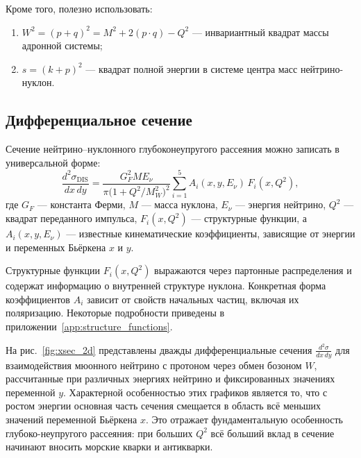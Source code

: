 Кроме того, полезно использовать:
\begin{enumerate}
  \item \( W^2 = (p + q)^2 = M^2 + 2(p \cdot q) - Q^2 \) — инвариантный квадрат массы адронной системы;
  \item \( s = (k + p)^2 \) — квадрат полной энергии в системе центра масс нейтрино-нуклон.
\end{enumerate}

\subsection{Дифференциальное сечение}

Сечение нейтрино–нуклонного глубоконеупругого рассеяния можно записать в универсальной форме:
\begin{equation}
  \frac{d^2 \sigma_{\text{DIS}}}{dx\,dy} =
  \frac{G_F^2 M E_\nu}{\pi \bigl(1 + Q^2/M_W^2\bigr)^2}
  \sum_{i=1}^{5} A_i(x, y, E_\nu)\, F_i(x, Q^2),
  \label{eq:xsec_general}
\end{equation}
где \( G_F \) — константа Ферми, \( M \) — масса нуклона, \( E_\nu \) — энергия нейтрино, \( Q^2 \) — квадрат переданного импульса, \( F_i(x, Q^2) \) — структурные функции, а \( A_i(x, y, E_\nu) \) — известные кинематические коэффициенты, зависящие от энергии и переменных Бьёркена \( x \) и \( y \).

Структурные функции \( F_i(x, Q^2) \) выражаются через партонные распределения и содержат информацию о внутренней структуре нуклона. Конкретная форма коэффициентов \( A_i \) зависит от свойств начальных частиц, включая их поляризацию. Некоторые подробности приведены в приложении~\ref{app:structure_functions}.

На рис.~\ref{fig:xsec_2d} представлены дважды дифференциальные сечения $\frac{d^2\sigma}{dx\,dy}$ для взаимодействия мюонного нейтрино с протоном через обмен бозоном $W$, рассчитанные при различных энергиях нейтрино и фиксированных значениях переменной $y$. Характерной особенностью этих графиков является то, что с ростом энергии основная часть сечения смещается в область всё меньших значений переменной Бьёркена $x$. Это отражает фундаментальную особенность глубоко-неупругого рассеяния: при больших $Q^2$ всё больший вклад в сечение начинают вносить морские кварки и антикварки.

